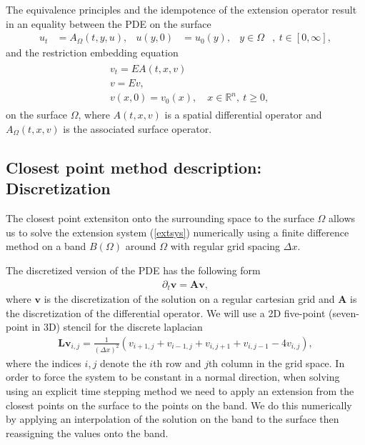 \documentclass[fleqn,12pt]{siamart1116}
\begin{document}
The equivalence principles and the idempotence of the extension operator result in an equality between the PDE on the surface
\begin{align}
u_t &= A_{\Omega}(t, y, u), & u(y, 0) &= u_0(y), & y \in \Omega &, \ t \in [0, \infty],
\end{align}
and the restriction embedding equation
\begin{align}\label{extsys}
\begin{split}
&v_t = EA(t, x, v)\\
&v = Ev,\\
&v(x, 0) = v_0(x), \quad x \in \mathbb{R}^n, \ t \geq 0,
\end{split}
\end{align}
on the surface $\Omega$, where $A(t, x, v)$ is a spatial differential operator and $A_{\Omega}(t, x, v)$ is the associated surface operator.

\subsection{Closest point method description: Discretization}

The closest point extensiton onto the surrounding space to the surface $\Omega$ allows us to solve the extension system (\ref{extsys}) numerically using a finite difference method on a band $B(\Omega)$ around $\Omega$ with regular grid spacing $\Delta x$.

The discretized version of the PDE has the following form
\begin{align}
\partial_t \mathbf{v} = \mathbf{Av},
\end{align}
where $\mathbf{v}$ is the discretization of the solution on a regular cartesian grid and $\mathbf{A}$ is the discretization of the differential operator. We will use a 2D five-point (seven-point in 3D) stencil for the discrete laplacian
\begin{align}
\mathbf{Lv}_{i,j} = \frac{1}{(\Delta x)^2}(v_{i+1, j} + v_{i-1, j} + v_{i, j+1} + v_{i, j-1} - 4v_{i, j} ),
\end{align}
where the indices $i, j$ denote the $i$th row and $j$th column in the grid space. In order to force the system to be constant in a normal direction, when solving using an explicit time stepping method we need to apply an extension from the closest points on the surface to the points on the band. We do this numerically by applying an interpolation of the solution on the band to the surface then reassigning the values onto the band.
\end{document}
